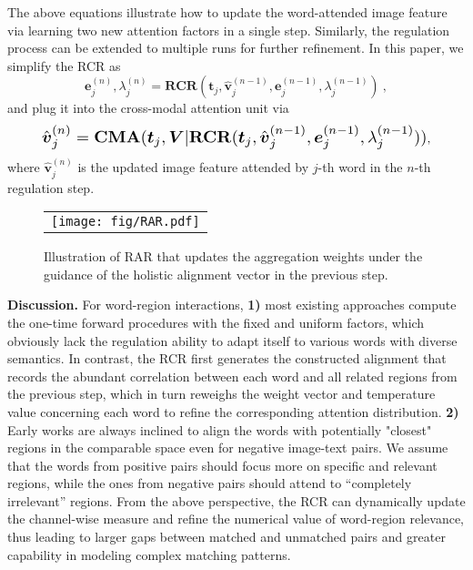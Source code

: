 \documentclass[journal]{IEEEtran}\newcommand{\ignore}[1]{}
\begin{document}
The above equations illustrate how to update the word-attended image feature via learning two new attention factors in a single step. Similarly, the regulation process can be extended to multiple runs for further refinement.
In this paper, we simplify the RCR as 
\begin{equation}
\label{eq:rcr}
    \boldsymbol{e}_j^{(n)}, \lambda_j^{(n)} = \mathbf{RCR}(\boldsymbol{t}_j,  \hat{\boldsymbol{v}}_{j}^{(n-1)}, \boldsymbol{e}_j^{(n-1)}, \lambda_j^{(n-1)}) \ ,
\end{equation}
and plug it into the cross-modal attention unit via
\begin{equation}
\label{eq:camrcr}
\resizebox{.88\hsize}{!}{$ \hat{\boldsymbol{v}}_j^{(n)} = \mathbf{CMA}(\boldsymbol{t}_j, \boldsymbol{V}| \mathbf{RCR}(\boldsymbol{t}_j, \hat{\boldsymbol{v}}_j^{(n-1)},\boldsymbol{e}_j^{(n-1)}, \lambda_j^{(n-1)}))$} ,
\end{equation}
where $\hat{\boldsymbol{v}}_j^{(n)}$ is the updated image feature attended by $j$-th word in the $n$-th regulation step.

\begin{figure}[t!]
	\centering
	\begin{tabular}{@{}c}
		\texttt{[image: fig/RAR.pdf]} 
	\end{tabular}
	\caption{Illustration of RAR that updates the aggregation weights under the guidance of the holistic alignment vector in the previous step.}
	\label{fig:RAR}
\end{figure}

{\bf Discussion.} For word-region interactions, \textbf{1)} most existing approaches compute the one-time forward procedures with the fixed and uniform factors, which obviously lack the regulation ability to adapt itself to various words with diverse semantics. In contrast, the RCR first generates the constructed alignment that records the abundant correlation between each word and all related regions from the previous step, which in turn reweighs the weight vector and temperature value concerning each word to refine the corresponding attention distribution. 
\textbf{2)} Early works are always inclined to align the words with potentially "closest" regions in the comparable space even for negative image-text pairs. We assume that the words from positive pairs should focus more on specific and relevant regions, while the ones from negative pairs should attend to “completely irrelevant” regions. From the above perspective, the RCR can dynamically update the channel-wise measure and refine the numerical value of word-region relevance, thus leading to larger gaps between matched and unmatched pairs and greater capability in modeling complex matching patterns.
\end{document}
